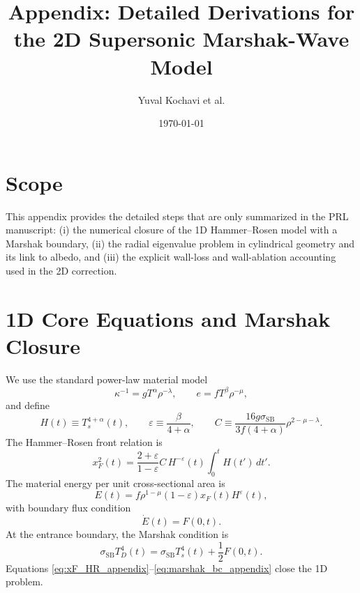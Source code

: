 \documentclass[11pt]{article}
\title{Appendix: Detailed Derivations for the 2D Supersonic Marshak-Wave Model}
\author{Yuval Kochavi et al.}
\date{\today}
\begin{document}
\maketitle

\section*{Scope}
This appendix provides the detailed steps that are only summarized in the PRL manuscript: (i) the numerical closure of the 1D Hammer--Rosen model with a Marshak boundary, (ii) the radial eigenvalue problem in cylindrical geometry and its link to albedo, and (iii) the explicit wall-loss and wall-ablation accounting used in the 2D correction.

\section{1D Core Equations and Marshak Closure}
We use the standard power-law material model
\begin{equation}
\kappa^{-1}=gT^{\alpha}\rho^{-\lambda},
\qquad
e=fT^{\beta}\rho^{-\mu},
\end{equation}
and define
\begin{equation}
H(t)\equiv T_s^{4+\alpha}(t),
\qquad
\varepsilon\equiv\frac{\beta}{4+\alpha},
\qquad
C\equiv\frac{16g\sigma_{\mathrm{SB}}}{3f(4+\alpha)}\rho^{2-\mu-\lambda}.
\end{equation}
The Hammer--Rosen front relation is
\begin{equation}
x_F^2(t)=\frac{2+\varepsilon}{1-\varepsilon}C\,H^{-\varepsilon}(t)\int_0^t H(t')\,dt'.
\label{eq:xF_HR_appendix}
\end{equation}
The material energy per unit cross-sectional area is
\begin{equation}
E(t)=f\rho^{1-\mu}(1-\varepsilon)x_F(t)H^{\varepsilon}(t),
\label{eq:E_HR_appendix}
\end{equation}
with boundary flux condition
\begin{equation}
\dot E(t)=F(0,t).
\label{eq:dEdt_flux_appendix}
\end{equation}
At the entrance boundary, the Marshak condition is
\begin{equation}
\sigma_{\mathrm{SB}}T_D^4(t)=\sigma_{\mathrm{SB}}T_s^4(t)+\frac{1}{2}F(0,t).
\label{eq:marshak_bc_appendix}
\end{equation}
Equations \eqref{eq:xF_HR_appendix}--\eqref{eq:marshak_bc_appendix} close the 1D problem.
\end{document}
